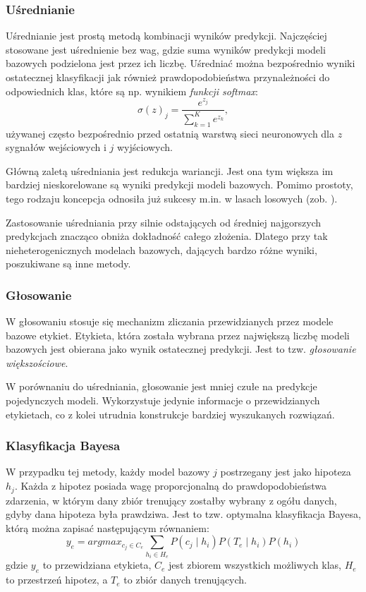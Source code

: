 \subsubsection{Uśrednianie}
Uśrednianie jest prostą metodą kombinacji wyników predykcji. Najczęściej stosowane jest uśrednienie bez wag, gdzie suma wyników predykcji modeli bazowych podzielona jest przez ich liczbę. Uśredniać można bezpośrednio wyniki ostatecznej klasyfikacji jak również prawdopodobieństwa przynależności do odpowiednich klas, które są np. wynikiem \textit{funkcji softmax}:
\begin{equation}
\sigma (z)_j= \frac{e^{z_j}}{\sum_{k=1}^{K} e^{z_k}},
\end{equation} 
używanej często bezpośrednio przed ostatnią warstwą sieci neuronowych dla $z$ sygnałów wejściowych i $j$ wyjściowych.

Główną zaletą uśredniania jest redukcja wariancji. Jest ona tym większa im bardziej nieskorelowane są wyniki predykcji modeli bazowych. Pomimo prostoty, tego rodzaju koncepcja odnosiła już sukcesy m.in. w lasach losowych (zob. \cite{Breiman2001}).

Zastosowanie uśredniania przy silnie odstających od średniej najgorszych predykcjach znacząco obniża dokładność całego złożenia. Dlatego przy tak nieheterogenicznych modelach bazowych, dających bardzo różne wyniki, poszukiwane są inne metody.

\subsubsection{Głosowanie}

W głosowaniu stosuje się mechanizm zliczania przewidzianych przez modele bazowe etykiet. Etykieta, która została wybrana przez największą liczbę modeli bazowych jest obierana jako wynik ostatecznej predykcji. Jest to tzw. \textit{głosowanie większościowe}.

W porównaniu do uśredniania, głosowanie jest mniej czułe na predykcje pojedynczych modeli. Wykorzystuje jedynie informacje o przewidzianych etykietach, co z kolei utrudnia konstrukcje bardziej wyszukanych rozwiązań.

\subsubsection{Klasyfikacja Bayesa}

W przypadku tej metody, każdy model bazowy $j$ postrzegany jest jako hipoteza $h_j$. Każda z hipotez posiada wagę proporcjonalną do prawdopodobieństwa zdarzenia, w którym dany zbiór trenujący zostałby wybrany z ogółu danych, gdyby dana hipoteza była prawdziwa. Jest to tzw. optymalna klasyfikacja Bayesa, którą można zapisać następującym równaniem:
\begin{equation}
y_e = arg max_{c_j \in C_e} \sum_{h_i \in H_e} P(c_j \mid h_i)P(T_e \mid h_i)P(h_i)
\end{equation}
gdzie $y_e$ to przewidziana etykieta, $C_e$ jest zbiorem wszystkich możliwych klas, $H_e$ to przestrzeń hipotez, a $T_e$ to zbiór danych trenujących.

